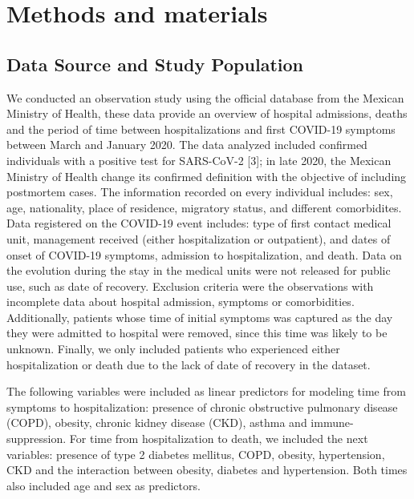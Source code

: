 \documentclass[10pt,letterpaper]{article}
\begin{document}
\hypertarget{methods-and-materials}{%
\section{Methods and materials}\label{methods-and-materials}}

\hypertarget{data-source-and-study-population}{%
\subsection{Data Source and Study
Population}\label{data-source-and-study-population}}

We conducted an observation study using the official database from the
Mexican Ministry of Health, these data provide an overview of hospital
admissions, deaths and the period of time between hospitalizations and
first COVID-19 symptoms between March and January 2020. The data
analyzed included confirmed individuals with a positive test for
SARS-CoV-2 {[}3{]}; in late 2020, the Mexican Ministry of Health change
its confirmed definition with the objective of including postmortem
cases. The information recorded on every individual includes: sex, age,
nationality, place of residence, migratory status, and different
comorbidites. Data registered on the COVID-19 event includes: type of
first contact medical unit, management received (either hospitalization
or outpatient), and dates of onset of COVID-19 symptoms, admission to
hospitalization, and death. Data on the evolution during the stay in the
medical units were not released for public use, such as date of
recovery. Exclusion criteria were the observations with incomplete data
about hospital admission, symptoms or comorbidities. Additionally,
patients whose time of initial symptoms was captured as the day they
were admitted to hospital were removed, since this time was likely to be
unknown. Finally, we only included patients who experienced either
hospitalization or death due to the lack of date of recovery in the
dataset.

The following variables were included as linear predictors for modeling
time from symptoms to hospitalization: presence of chronic obstructive
pulmonary disease (COPD), obesity, chronic kidney disease (CKD), asthma
and immune-suppression. For time from hospitalization to death, we
included the next variables: presence of type 2 diabetes mellitus, COPD,
obesity, hypertension, CKD and the interaction between obesity, diabetes
and hypertension. Both times also included age and sex as predictors.
\end{document}
